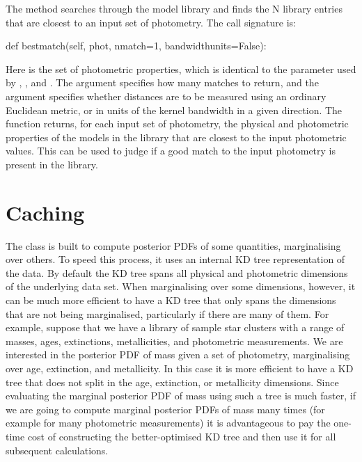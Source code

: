 \documentclass[letterpaper,10pt,english]{sphinxmanual}
\begin{document}
The  method searches through the model library and finds the N library entries that are closest to an input set of photometry. The call signature is:

\begin{sphinxVerbatim}[commandchars=\\\{\}]
def bestmatch(self, phot, nmatch=1, bandwidth\PYGZus{}units=False):
\end{sphinxVerbatim}

Here  is the set of photometric properties, which is identical to the  parameter used by , , and . The argument  specifies how many matches to return, and the argument  specifies whether distances are to be measured using an ordinary Euclidean metric, or in units of the kernel bandwidth in a given direction. The function returns, for each input set of photometry, the physical and photometric properties of the  models in the library that are closest to the input photometric values. This can be used to judge if a good match to the input photometry is present in the library.


\section{Caching}
\label{\detokenize{bayesphot:caching}}
The  class is built to compute posterior PDFs of some
quantities, marginalising over others. To speed this process, it uses
an internal KD tree representation of the data. By default the KD tree
spans all physical and photometric dimensions of the underlying data
set. When marginalising over some dimensions, however, it can be much
more efficient to have a KD tree that only spans the dimensions that
are not being marginalised, particularly if there are many of
them. For example, suppose that we have a library of sample star
clusters with a range of masses, ages, extinctions, metallicities, and
photometric measurements. We are interested in the posterior PDF of
mass given a set of photometry, marginalising over age, extinction,
and metallicity. In this case it is more efficient to have a KD tree
that does not split in the age, extinction, or metallicity
dimensions. Since evaluating the marginal posterior PDF of mass using
such a tree is much faster, if we are going to compute marginal
posterior PDFs of mass many times (for example for many photometric
measurements) it is advantageous to pay the one-time cost of
constructing the better-optimised KD tree and then use it for all
subsequent calculations.
\end{document}
